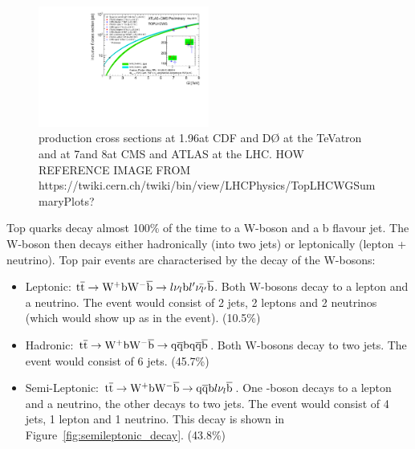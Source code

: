 \begin{figure}[hbtp]
   \centering
     \includegraphics[width=0.5\textwidth]{Chapters/02_Theory/Images/toplhcwg_ttxsec_sqrts_may2015}\hfill
     \caption{\ttbar production cross sections at 1.96\TeV at CDF and D{\O} at the TeVatron and at 7\TeV and
     8\TeV at CMS and ATLAS at the LHC. HOW REFERENCE IMAGE FROM
     https://twiki.cern.ch/twiki/bin/view/LHCPhysics/TopLHCWGSummaryPlots?}
     \label{fig:ttbar_cross_sections}
\end{figure}

Top quarks decay almost 100\% of the time to a W-boson and a b flavour jet. The W-boson then decays either
hadronically (into two jets) or leptonically (lepton + neutrino). Top pair events are characterised by the
decay of the W-bosons:
\begin{itemize}
  \item Leptonic: $\mathrm{t}\overline{\mathrm{t}} \rightarrow \mathrm{W}^{+} \mathrm{b} \mathrm{W}^{-} \overline{\mathrm{b}} \rightarrow l \nu_{l}\mathrm{b}
  l' \bar{\nu_{l'}} \overline{\mathrm{b}}$.
  Both W-bosons decay to a lepton and a neutrino. The event would consist of 2 jets, 2 leptons and 2 neutrinos (which would show
  up as \met in the event). (10.5\%)
  \item Hadronic: $\mathrm{t}\overline{\mathrm{t}} \rightarrow \mathrm{W}^{+} \mathrm{b} \mathrm{W}^{-} \overline{\mathrm{b}} \rightarrow \mathrm{q} \overline{\mathrm{q}} \mathrm{b} \mathrm{q} \overline{\mathrm{q}}
  \overline{\mathrm{b}}$. Both W-bosons decay to two jets. The event would consist of 6 jets. (45.7\%)
  \item Semi-Leptonic: $\mathrm{t}\overline{\mathrm{t}} \rightarrow \mathrm{W}^{+} \mathrm{b} \mathrm{W}^{-} \overline{\mathrm{b}} \rightarrow \mathrm{q} \overline{\mathrm{q}} \mathrm{b} l \nu_{l}
  \overline{\mathrm{b}}$. One \W-boson decays to a lepton and a neutrino, the other decays to two jets. The event would
  consist of 4 jets, 1 lepton and 1 neutrino. This decay is shown in Figure~\ref{fig:semileptonic_decay}.
  (43.8\%)
\end{itemize}

